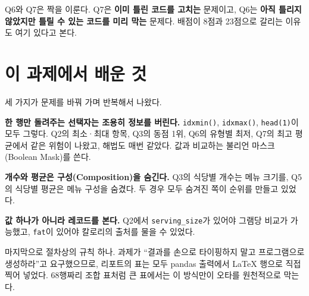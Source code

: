 Q6와 Q7은 짝을 이룬다. Q7은 \textbf{이미 틀린 코드를 고치는} 문제이고, Q6는 \textbf{아직
틀리지 않았지만 틀릴 수 있는 코드를 미리 막는} 문제다. 배점이 8점과 23점으로 갈리는
이유도 여기 있다고 본다.

\section{이 과제에서 배운 것}
\label{sec:hw1-learned}

세 가지가 문제를 바꿔 가며 반복해서 나왔다.

\textbf{한 행만 돌려주는 선택자는 조용히 정보를 버린다.} \texttt{idxmin()},
\texttt{idxmax()}, \texttt{head(1)}이 모두 그렇다. Q2의 최소·최대 항목, Q3의 동점 1위,
Q6의 유형별 최저, Q7의 최고 평균에서 같은 위험이 나왔고, 해법도 매번 같았다. 값과
비교하는 불리언 마스크(Boolean Mask)를 쓴다.

\textbf{개수와 평균은 구성(Composition)을 숨긴다.} Q3의 식당별 개수는 메뉴 크기를,
Q5의 식당별 평균은 메뉴 구성을 숨겼다. 두 경우 모두 숨겨진 쪽이 순위를 만들고 있었다.

\textbf{값 하나가 아니라 레코드를 본다.} Q2에서 \texttt{serving\_size}가 있어야 그램당
비교가 가능했고, \texttt{fat}이 있어야 칼로리의 출처를 물을 수 있었다.

마지막으로 절차상의 규칙 하나. 과제가 ``결과를 손으로 타이핑하지 말고 프로그램으로
생성하라''고 요구했으므로, 리포트의 표는 모두 pandas 출력에서 LaTeX 행으로 직접 찍어
넣었다. 68행짜리 조합 표처럼 큰 표에서는 이 방식만이 오타를 원천적으로 막는다.
